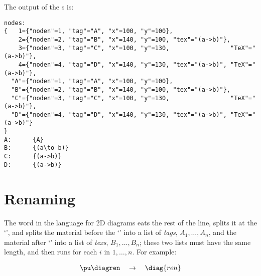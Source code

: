 \documentclass[oneside]{article}
\begin{document}
The output of the s is:

{\footnotesize
\begin{verbatim}
nodes:
{   1={"noden"=1, "tag"="A", "x"=100, "y"=100},
    2={"noden"=2, "tag"="B", "x"=140, "y"=100, "tex"="(a->b)"},
    3={"noden"=3, "tag"="C", "x"=100, "y"=130,                 "TeX"="(a->b)"},
    4={"noden"=4, "tag"="D", "x"=140, "y"=130, "tex"="(a->b)", "TeX"="(a->b)"},
  "A"={"noden"=1, "tag"="A", "x"=100, "y"=100},
  "B"={"noden"=2, "tag"="B", "x"=140, "y"=100, "tex"="(a->b)"},
  "C"={"noden"=3, "tag"="C", "x"=100, "y"=130,                 "TeX"="(a->b)"},
  "D"={"noden"=4, "tag"="D", "x"=140, "y"=130, "tex"="(a->b)", "TeX"="(a->b)"}
}
A:      {A}
B:      {(a\to b)}
C:      {(a->b)}
D:      {(a->b)}
\end{verbatim}
}


\section{Renaming}

The word  in the language for 2D diagrams eats the rest of the
line, splits it at the `\co{==>}', and splits the material before the
`\co{==>}' into a list of {\sl tags}, $A_1, \ldots, A_n$, and the
material after `\co{==>}' into a list of {\sl texs}, $B_1, \ldots,
B_n$; these two lists must have the same length, and then 
runs  for each $i$ in $1,\ldots,n$. For
example:


$$\pu
  \myvcenter{\diagren}
  \quad
  \to
  \quad
  \diag{ren}
$$
\end{document}
